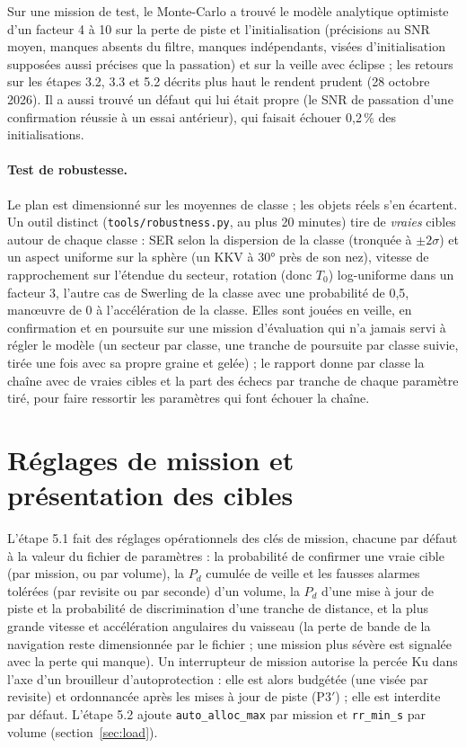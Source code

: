 \documentclass[11pt,a4paper]{article}
\newcommand{\code}[1]{\texttt{\small #1}}
\begin{document}
Sur une mission de test, le Monte-Carlo a trouvé le modèle analytique optimiste d'un facteur 4 à 10 sur la perte de
piste et l'initialisation (précisions au SNR moyen, manques absents du filtre, manques indépendants, visées
d'initialisation supposées aussi précises que la passation) et sur la veille avec éclipse ; les retours sur les étapes
3.2, 3.3 et 5.2 décrits plus haut le rendent prudent (28 octobre 2026). Il a aussi trouvé un défaut qui lui était propre
(le SNR de passation d'une confirmation réussie à un essai antérieur), qui faisait échouer 0,2\,\% des initialisations.

\paragraph{Test de robustesse.} Le plan est dimensionné sur les moyennes de classe ; les objets réels s'en écartent. Un
outil distinct (\code{tools/robustness.py}, au plus 20 minutes) tire de \emph{vraies} cibles autour de chaque classe :
SER selon la dispersion de la classe (tronquée à $\pm2\sigma$) et un aspect uniforme sur la sphère (un KKV à
\ang{30} près de son nez), vitesse de rapprochement sur l'étendue du secteur, rotation (donc $T_0$) log-uniforme dans un
facteur 3, l'autre cas de Swerling de la classe avec une probabilité de 0,5, man\oe{}uvre de 0 à l'accélération de la
classe. Elles sont jouées en veille, en confirmation et en poursuite sur une mission d'évaluation qui n'a jamais servi à
régler le modèle (un secteur par classe, une tranche de poursuite par classe suivie, tirée une fois avec sa propre graine et gelée) ; le rapport donne par classe la
chaîne avec de vraies cibles et la part des échecs par tranche de chaque paramètre tiré, pour faire ressortir les
paramètres qui font échouer la chaîne.

\section{Réglages de mission et présentation des cibles}\label{sec:mission51}
L'étape 5.1 fait des réglages opérationnels des clés de mission, chacune par défaut à la valeur du fichier de
paramètres : la probabilité de confirmer une vraie cible (par mission, ou par volume), la $P_d$ cumulée de veille et les
fausses alarmes tolérées (par revisite ou par seconde) d'un volume, la $P_d$ d'une mise à jour de piste et la
probabilité de discrimination d'une tranche de distance, et la plus grande vitesse et accélération angulaires du
vaisseau (la perte de bande de la navigation reste dimensionnée par le fichier ; une mission plus sévère est signalée
avec la perte qui manque). Un interrupteur de mission autorise la percée Ku dans l'axe d'un brouilleur
d'autoprotection : elle est alors budgétée (une visée par revisite) et ordonnancée après les mises à jour de piste
(P3$'$) ; elle est interdite par défaut. L'étape 5.2 ajoute \code{auto\_alloc\_max} par mission et \code{rr\_min\_s}
par volume (section~\ref{sec:load}).
\end{document}

